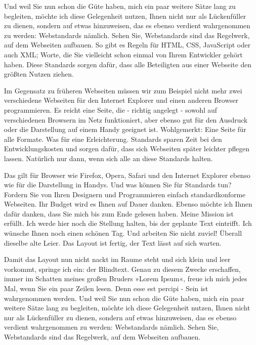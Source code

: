 Und weil Sie nun schon die Güte haben, mich ein paar weitere Sätze lang zu begleiten, möchte ich diese Gelegenheit nutzen, Ihnen nicht nur als Lückenfüller zu dienen, sondern auf etwas hinzuweisen, das es ebenso verdient wahrgenommen zu werden: Webstandards nämlich. Sehen Sie, Webstandards sind das Regelwerk, auf dem Webseiten aufbauen. So gibt es Regeln für HTML, CSS, JavaScript oder auch XML; Worte, die Sie vielleicht schon einmal von Ihrem Entwickler gehört haben. Diese Standards sorgen dafür, dass alle Beteiligten aus einer Webseite den größten Nutzen ziehen.

Im Gegensatz zu früheren Webseiten müssen wir zum Beispiel nicht mehr zwei verschiedene Webseiten für den Internet Explorer und einen anderen Browser programmieren. Es reicht eine Seite, die - richtig angelegt - sowohl auf verschiedenen Browsern im Netz funktioniert, aber ebenso gut für den Ausdruck oder die Darstellung auf einem Handy geeignet ist. Wohlgemerkt: Eine Seite für alle Formate. Was für eine Erleichterung. Standards sparen Zeit bei den Entwicklungskosten und sorgen dafür, dass sich Webseiten später leichter pflegen lassen. Natürlich nur dann, wenn sich alle an diese Standards halten.

Das gilt für Browser wie Firefox, Opera, Safari und den Internet Explorer ebenso wie für die Darstellung in Handys. Und was können Sie für Standards tun? Fordern Sie von Ihren Designern und Programmieren einfach standardkonforme Webseiten. Ihr Budget wird es Ihnen auf Dauer danken. Ebenso möchte ich Ihnen dafür danken, dass Sie mich bis zum Ende gelesen haben. Meine Mission ist erfüllt. Ich werde hier noch die Stellung halten, bis der geplante Text eintrifft. Ich wünsche Ihnen noch einen schönen Tag. Und arbeiten Sie nicht zuviel! Überall dieselbe alte Leier. Das Layout ist fertig, der Text lässt auf sich warten.

Damit das Layout nun nicht nackt im Raume steht und sich klein und leer vorkommt, springe ich ein: der Blindtext. Genau zu diesem Zwecke erschaffen, immer im Schatten meines großen Bruders »Lorem Ipsum«, freue ich mich jedes Mal, wenn Sie ein paar Zeilen lesen. Denn esse est percipi - Sein ist wahrgenommen werden. Und weil Sie nun schon die Güte haben, mich ein paar weitere Sätze lang zu begleiten, möchte ich diese Gelegenheit nutzen, Ihnen nicht nur als Lückenfüller zu dienen, sondern auf etwas hinzuweisen, das es ebenso verdient wahrgenommen zu werden: Webstandards nämlich. Sehen Sie, Webstandards sind das Regelwerk, auf dem Webseiten aufbauen.

